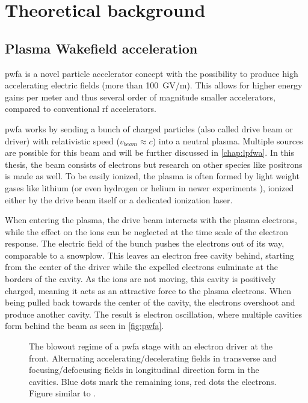 \documentclass[bachelor_thesis]{subfiles}
\begin{document}
\chapter{Theoretical background} \label{chap:theory}
\section{Plasma Wakefield acceleration}
\Gls{pwfa} is a novel particle accelerator concept \cite{Chen1985} with the possibility to produce high accelerating electric fields (more than \qty{100}{\giga\volt/\m}). This allows for higher energy gains per meter
and thus several order of magnitude smaller accelerators, compared to conventional \gls{rf} accelerators.

\Gls{pwfa} works by sending a bunch of charged particles (also called drive beam or driver) with relativistic speed ($v_{beam}\approx c$) into a neutral plasma. Multiple sources are possible for this beam and will be further discussed in \autoref{chap:lpfwa}.
In this thesis, the beam consists of electrons but research on other species like positrons \cite{Gessner2016} is made as well. To be easily ionized, the plasma is often formed by light weight gases like lithium (or even hydrogen or helium in newer experiments \cite{Schoebel2022}), 
ionized either by the drive beam itself or a dedicated ionization laser.

When entering the plasma, the drive beam interacts with the plasma electrons, while the effect on the ions can be neglected at the time scale of the electron response. The electric field of the bunch pushes the electrons out of its way, comparable to a snowplow. 
This leaves an electron free cavity behind, starting from the center of the driver while the expelled electrons culminate at the borders of the cavity. As the ions are not moving, this cavity is positively charged, meaning it acts as an attractive force to the plasma electrons.
When being pulled back towards the center of the cavity, the electrons overshoot and produce another cavity. The result is electron oscillation, where multiple cavities form behind the beam as seen in \autoref{fig:pwfa}.

\begin{figure}
	\centering
	
	\caption{The blowout regime of a \gls{pwfa} stage with an electron driver at the front. Alternating accelerating/decelerating fields in transverse and focusing/defocusing fields in longitudinal direction form in the cavities. 
	Blue dots mark the remaining ions, red dots the electrons. Figure similar to \cite{Kurz2020}.}
	\label{fig:pwfa}
\end{figure}
\end{document}
